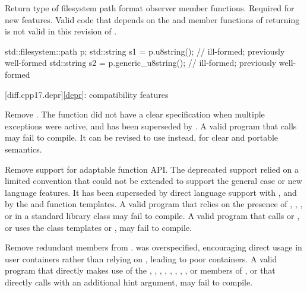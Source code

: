 \change
Return type of filesystem path format observer member functions.
\rationale
Required for new features.
\effect
Valid \CppXVII{} code that depends on the  and
 member functions of 
returning  is not valid in this revision of \Cpp{}.
\begin{example}
\begin{codeblock}
std::filesystem::path p;
std::string s1 = p.u8string();          // ill-formed; previously well-formed
std::string s2 = p.generic_u8string();  // ill-formed; previously well-formed
\end{codeblock}
\end{example}

[diff.cpp17.depr]{\ref{depr}: compatibility features}

\nodiffref
\change
Remove .
\rationale
The function did not have a clear specification when multiple exceptions were
active, and has been superseded by .
\effect
A valid \CppXVII{} program that calls  may fail
to compile. It can be revised to use  instead,
for clear and portable semantics.

\nodiffref
\change
Remove support for adaptable function API.
\rationale
The deprecated support relied on a limited convention that could not be
extended to support the general case or new language features. It has been
superseded by direct language support with , and by the
 and  function templates.
\effect
A valid \CppXVII{} program that relies on the presence of ,
, , or
 in a standard library class may fail to compile. A
valid \CppXVII{} program that calls  or , or uses the
class templates  or , may fail to
compile.

\nodiffref
\change
Remove redundant members from .
\rationale
{} was overspecified, encouraging direct usage in user containers
rather than relying on , leading to poor containers.
\effect
A valid \CppXVII{} program that directly makes use of the ,
, , ,
, , , , or
 members of , or that directly calls
 with an additional hint argument, may fail to compile.

